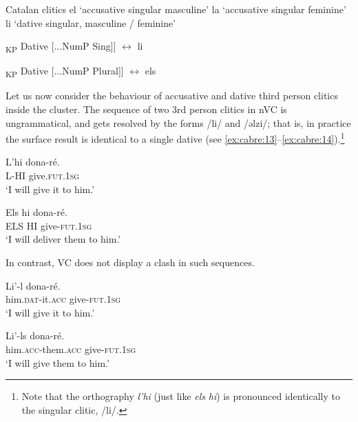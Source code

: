 \documentclass[output=paper,modfonts,nonflat,newtxmath,colorlinks,citecolor=brown]{langsci/langscibook}
\begin{document}
\ea%
	Catalan clitics
    \label{ex:cabre:11}
    \ea el ‘accusative singular masculine’
    \ex la ‘accusative singular feminine’
    \ex li ‘dative singular, masculine / feminine’
    \z
    \z

\ea%
    \label{ex:cabre:12}
   \ea {[}\textsubscript{KP}  Dative [...NumP Sing]{]} $\longleftrightarrow$ li

   \ex {[}\textsubscript{KP} Dative   [...NumP Plural]{]} $\longleftrightarrow$ els
   \z
    \z

Let us now consider the behaviour of accusative and dative third person clitics inside the cluster. The sequence of two 3rd person clitics in nVC is ungrammatical, and gets resolved by the forms /li/ and /ǝlzi/; that is, in practice the surface result is identical to a single dative (see \ref{ex:cabre:13}--\ref{ex:cabre:14}).\footnote{Note that the orthography \textit{l’hi} (just like \textit{els} \textit{hi}) is pronounced identically to the singular clitic, /li/.} %

\ea
    \label{ex:cabre:13}

    \ex
    \gll L’hi     dona-ré.\\
    L-HI    give.\textsc{fut.1sg}\\
    \glt ‘I will give it to him.’
    \z
    \z

\ea%
    \label{ex:cabre:14}

   \ex
   \gll Els hi  dona-ré.\\
   ELS HI  give-\textsc{fut.1sg}\\
   \glt ‘I will deliver them to him.’
   \z
   \z


In contrast, VC does not display a clash in such sequences.

\ea%
    \label{ex:cabre:15}
     \ea
    \gll Li’-l     dona-ré. \\
    	him.\textsc{dat}-it.\textsc{acc} give-\textsc{fut.1sg} \\
    	\glt ‘I will give it to him.’

    \ex
    \gll Li’-ls    dona-ré.\\
    him.\textsc{acc}-them.\textsc{acc} give-\textsc{fut.1sg}  \\
    \glt  ‘I will give them to him.’
    \z
    \z
\end{document}
